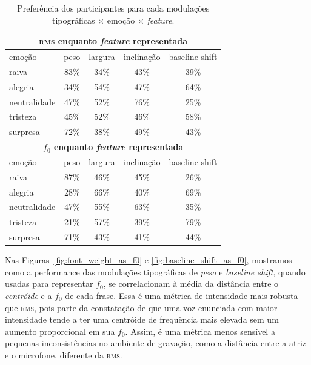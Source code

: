 \documentclass[11pt]{article}
\begin{document}
\begin{table}
    \small
    \begin{tabular*}{\linewidth}{lcccc}
        \toprule
        \multicolumn{5}{c}{ \textbf{\textsc{rms} enquanto {\itshape feature} representada} }     \\
        \midrule
        emoção & peso & largura & inclinação & baseline shift  \\
        \midrule
        raiva           & 83\% & 34\% & 43\% & 39\% \\
        alegria         & 34\% & 54\% & 47\% & 64\% \\
        neutralidade    & 47\% & 52\% & \cellcolor[HTML]{9ef7cd}76\% & 25\% \\
        tristeza        & 45\% & 52\% & 46\% & 58\% \\
        surpresa        & \cellcolor[HTML]{9ef7cd}72\% & 38\% & 49\% & 43\% \\
        \midrule
        \multicolumn{5}{c}{ \textbf{$f_0$ enquanto {\itshape feature} representada} }      \\
        \midrule
        emoção & peso & largura & inclinação & baseline shift  \\
        \midrule
        raiva           & \cellcolor[HTML]{9ef7cd}87\% & 46\% & 45\% & 26\% \\
        alegria         & 28\% & 66\% & 40\% & \cellcolor[HTML]{9ef7cd}69\% \\
        neutralidade    & 47\% & 55\% & 63\% & 35\% \\
        tristeza        & 21\% & 57\% & 39\% & \cellcolor[HTML]{9ef7cd}79\% \\
        surpresa        & 71\% & 43\% & 41\% & 44\% \\
        \bottomrule
    \end{tabular*}
    \caption{Preferência dos participantes para cada modulações tipográficas $\times$ emoção $\times$ {\itshape feature}. }
    \label{tab:type_perf}
\end{table}
  
  Nas Figuras~\ref{fig:font_weight_as_f0} e \ref{fig:baseline_shift_as_f0}, mostramos como a performance das modulações tipográficas de {\itshape peso} e {\itshape baseline shift}, quando usadas para representar $f_0$, se correlacionam à média da distância entre o {\itshape centróide} e a $f_0$ de cada frase. Essa é uma métrica de intensidade mais robusta que \textsc{rms}, pois parte da constatação de que uma voz enunciada com maior intensidade tende a ter uma centróide de frequência mais elevada sem um aumento proporcional em sua $f_0$. Assim, é uma métrica menos sensível a pequenas inconsistências no ambiente de gravação, como a distância entre a atriz e o microfone, diferente da \textsc{rms}.
  
\end{document}

